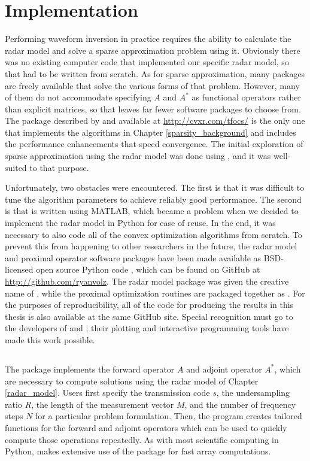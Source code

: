 \section{Implementation}
\label{waveform_inversion_implementation}
Performing waveform inversion in practice requires the ability to calculate the radar model and solve a sparse approximation problem using it. Obviously there was no existing computer code that implemented our specific radar model, so that had to be written from scratch. As for sparse approximation, many packages are freely available that solve the various forms of that problem. However, many of them do not accommodate specifying $A$ and $A^*$ as functional operators rather than explicit matrices, so that leaves far fewer software packages to choose from. The  package described by \textcite{BCG11} and available at \url{http://cvxr.com/tfocs/}\nocite{tfocs} is the only one that implements the algorithms in Chapter \ref{sparsity_background} and includes the performance enhancements that speed convergence. The initial exploration of sparse approximation using the radar model was done using , and it was well-suited to that purpose.

Unfortunately, two obstacles were encountered. The first is that it was difficult to tune the algorithm parameters to achieve reliably good performance. The second is that  is written using MATLAB, which became a problem when we decided to implement the radar model in Python for ease of reuse. In the end, it was necessary to also code all of the convex optimization algorithms from scratch. To prevent this from happening to other researchers in the future, the radar model and proximal operator software packages have been made available as BSD-licensed open source Python code \autocite{python2_7, Oli07}, which can be found on GitHub at \url{http://github.com/ryanvolz}. The radar model package was given the creative name of , while the proximal optimization routines are packaged together as . For the purposes of reproducibility, all of the code for producing the results in this thesis is also available at the same GitHub site. Special recognition must go to the developers of  \autocite{matplotlib} and  \autocite{ipython}; their plotting and interactive programming tools have made this work possible.

\subsection{}
The  package implements the forward operator $A$ and adjoint operator $A^*$, which are necessary to compute solutions using the radar model of Chapter \ref{radar_model}.  Users first specify the transmission code $s$, the undersampling ratio $R$, the length of the measurement vector $M$, and the number of frequency steps $N$ for a particular problem formulation. Then, the program creates tailored functions for the forward and adjoint operators which can be used to quickly compute those operations repeatedly. As with most scientific computing in Python,  makes extensive use of the  package \autocite{numpy} for fast array computations.

